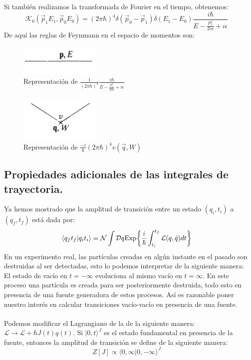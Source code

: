 Si también realizamos la transformada de Fourier en el tiempo, obtenemos:
\begin{equation}
\mathcal{K}_0(\vec{p}_1E_1,\vec{p}_0E_0)=(2\pi\hbar)^4\delta(\vec{p}_0-\vec{p}_1)\delta(E_1-E_0)\frac{i\hbar}{E-\frac{p_{1}^{2}}{2m}+i\epsilon}
\end{equation}
De aquí las reglas de Feynmann en el espacio de momentos son:
\begin{figure}
\caption[Diagrama de Feynmann primera cuantización]{Representación de $\frac{1}{(2\pi\hbar)^4}\frac{i\hbar}{E-\frac{p_{1}^{2}}{2m}+i\epsilon}$}
\includegraphics[width=4cm]{Imagenes/Fig6}
\end{figure}
\begin{figure}
\caption[Diagrama de Feynmann primera cuantización]{Representación de $\frac{-i}{\hbar}(2\pi\hbar)^4v(\vec{q},W)$}
\includegraphics[width=4cm]{Imagenes/Fig7}
\end{figure}
\newpage

\subsection{Propiedades adicionales de las integrales de trayectoria.}
Ya hemos mostrado que la amplitud de transición entre un estado $(q_i,t_i)$ a $(q_f,t_f)$ está dada por:
\begin{equation}
\langle q_{f}t_{f}|q_it_i\rangle=\mathcal{N}\int\mathcal{D}q\text{Exp\ensuremath{\left\{ \frac{i}{\hbar}\int_{t_{i}}^{t_{f}}\mathcal{L}(q,\dot{q})dt\right\} }}
\end{equation}
En un experimento real, las partículas creadas en algún instante en el pasado son destruidas al ser detectadas, esto lo podemos interpretar de la siguiente manera: El estado de vacío en $t=-\infty$ evoluciona al mismo vacío en $t=\infty$. En este proceso una partícula es creada para ser posteriormente destruida, todo esto en presencia de una fuente generadora de estos procesos. Así es razonable poner nuestro interés en calcular transiciones vacío-vacío en presencia de una fuente.\\
\\
Podemos modificar el Lagrangiano de la de la siguiente manera: $\mathcal{L} \to \mathcal{L}+\hbar J(t)q(t)$. Si $|0,t\rangle^J $ es el estado fundamental en presencia de la fuente, entonces la amplitud de transición se define de la siguiente manera:
\begin{equation}
Z[J]\propto \langle 0,\infty|0,-\infty\rangle ^J
\end{equation}












